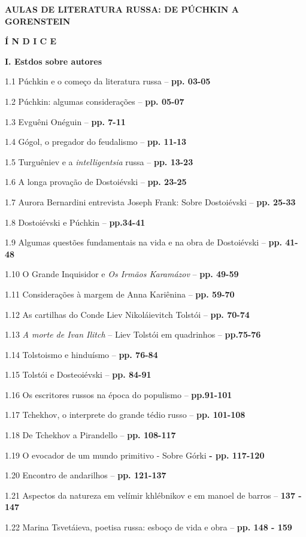 \textbf{AULAS DE LITERATURA RUSSA: DE PÚCHKIN A GORENSTEIN}

\textbf{Í N D I C E}

\textbf{I. Estdos sobre autores}

1.1 Púchkin e o começo da literatura russa -- \textbf{pp. 03-05}

1.2 Púchkin: algumas considerações -- \textbf{pp. 05-07}

1.3 Evguêni Onéguin -- \textbf{pp. 7-11}

1.4 Gógol, o pregador do feudalismo -- \textbf{pp. 11-13}

1.5 Turguêniev e a \emph{intelligentsia} russa -- \textbf{pp. 13-23}

1.6 A longa provação de Dostoiévski -- \textbf{pp. 23-25}

1.7 Aurora Bernardini entrevista Joseph Frank: Sobre Dostoiévski --
\textbf{pp. 25-33}

1.8 Dostoiévski e Púchkin -- \textbf{pp.34-41}

1.9 Algumas questões fundamentais na vida e na obra de Dostoiévski --
\textbf{pp. 41-48}

1.10 O Grande Inquisidor e \emph{Os Irmãos Karamázov} -- \textbf{pp.
49-59}

1.11 Considerações à margem de Anna Kariênina -- \textbf{pp. 59-70}

1.12 As cartilhas do Conde Liev Nikoláievitch Tolstói -- \textbf{pp.
70-74}

1.13 \emph{A morte de Ivan Ilitch} -- Liev Tolstói em quadrinhos --
\textbf{pp.75-76}

1.14 Tolstoismo e hinduísmo -- \textbf{pp. 76-84}

1.15 Tolstói e Dosteoiévski -- \textbf{pp. 84-91}

1.16 Os escritores russos na época do populismo -- \textbf{pp.91-101}

1.17 Tchekhov, o interprete do grande tédio russo -- \textbf{pp.
101-108}

1.18 De Tchekhov a Pirandello -- \textbf{pp. 108-117}

1.19 O evocador de um mundo primitivo - Sobre Górki \textbf{- pp.
117-120}

1.20 Encontro de andarilhos -- \textbf{pp. 121-137}

1.21 Aspectos da natureza em velímir khlébnikov e em manoel de barros --
\textbf{137 - 147}

1.22 Marina Tsvetáieva, poetisa russa: esboço de vida e obra --
\textbf{pp. 148 - 159}

